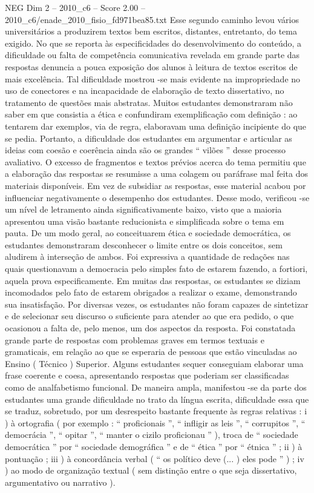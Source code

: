 \begin{textsample}{NEG Dim 2 – 2010\_c6 – Score 2.00 – 2010\_c6/enade\_2010\_fisio\_fd971bea85.txt}
Esse segundo caminho levou vários universitários a produzirem textos bem escritos, distantes, entretanto, do tema exigido.
No que se reporta às especificidades do desenvolvimento do conteúdo, a dificuldade ou falta de competência comunicativa revelada em grande parte das respostas denuncia a pouca exposição dos alunos à leitura de textos escritos de mais excelência.
Tal dificuldade mostrou -se mais evidente na impropriedade no uso de conectores e na incapacidade de elaboração de texto dissertativo, no tratamento de questões mais abstratas.
Muitos estudantes demonstraram não saber em que consistia a ética e confundiram exemplificação com definição : ao tentarem dar exemplos, via de regra, elaboravam uma definição incipiente do que se pedia.
Portanto, a dificuldade dos estudantes em argumentar e articular as ideias com coesão e coerência ainda são os grandes “ vilões ” desse processo avaliativo.
O excesso de fragmentos e textos prévios acerca do tema permitiu que a elaboração das respostas se resumisse a uma colagem ou paráfrase mal feita dos materiais disponíveis.
Em vez de subsidiar as respostas, esse material acabou por influenciar negativamente o desempenho dos estudantes.
Desse modo, verificou -se um nível de letramento ainda significativamente baixo, visto que a maioria apresentou uma visão bastante reducionista e simplificada sobre o tema em pauta.
De um modo geral, ao conceituarem ética e sociedade democrática, os estudantes demonstraram desconhecer o limite entre os dois conceitos, sem aludirem à interseção de ambos.
Foi expressiva a quantidade de redações nas quais questionavam a democracia pelo simples fato de estarem fazendo, a fortiori, aquela prova especificamente.
Em muitas das respostas, os estudantes se diziam incomodados pelo fato de estarem obrigados a realizar o exame, demonstrando sua insatisfação.
Por diversas vezes, os estudantes não foram capazes de sintetizar e de selecionar seu discurso o suficiente para atender ao que era pedido, o que ocasionou a falta de, pelo menos, um dos aspectos da resposta.
Foi constatada grande parte de respostas com problemas graves em termos textuais e gramaticais, em relação ao que se esperaria de pessoas que estão vinculadas ao Ensino ( Técnico ) Superior.
Alguns estudantes sequer conseguiam elaborar uma frase coerente e coesa, apresentando respostas que poderiam ser classificadas como de analfabetismo funcional.
De maneira ampla, manifestou -se da parte dos estudantes uma grande dificuldade no trato da língua escrita, dificuldade essa que se traduz, sobretudo, por um desrespeito bastante frequente às regras relativas : i ) à ortografia ( por exemplo : “ proficionais ”, “ infligir as leis ”, “ corrupitos ”, “ democrácia ”, “ opitar ”, “ manter o cizilo proficionau ” ), troca de “ sociedade democrática ” por “ sociedade demográfica ” e de “ ética ” por “ étnica ” ; ii ) à pontuação ; iii ) à concordância verbal ( “ os político deve (... ) eles pode ” ) ; iv ) ao modo de organização textual ( sem distinção entre o que seja dissertativo, argumentativo ou narrativo ).

\end{textsample}
